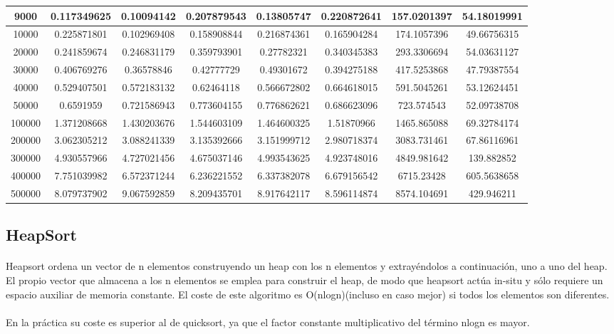 \documentclass{article}
\begin{document}
\begin{table}[]
\begin{tabular}{|c|c|c|c|c|c|c|c| }
9000	&0.117349625	&0.10094142	&0.207879543	&0.13805747	&0.220872641	&157.0201397	&54.18019991\\ \hline
10000	&0.225871801	&0.102969408	&0.158908844	&0.216874361	&0.165904284	&174.1057396	&49.66756315\\ \hline
20000	&0.241859674	&0.246831179	&0.359793901	&0.27782321	&0.340345383	&293.3306694	&54.03631127\\ \hline
30000	&0.406769276	&0.36578846	&0.42777729	&0.49301672	&0.394275188	&417.5253868	&47.79387554\\ \hline
40000	&0.529407501	&0.572183132	&0.62464118	&0.566672802	&0.664618015	&591.5045261	&53.12624451\\ \hline
50000	&0.6591959	&0.721586943	&0.773604155	&0.776862621	&0.686623096	&723.574543	&52.09738708\\ \hline
100000	&1.371208668	&1.430203676	&1.544603109	&1.464600325	&1.51870966	&1465.865088	&69.32784174\\ \hline
200000	&3.062305212	&3.088241339	&3.135392666	&3.151999712	&2.980718374	&3083.731461	&67.86116961\\ \hline
300000	&4.930557966	&4.727021456	&4.675037146	&4.993543625	&4.923748016	&4849.981642	&139.882852\\ \hline
400000	&7.751039982	&6.572371244	&6.236221552	&6.337382078	&6.679156542	&6715.23428	&605.5638658\\ \hline
500000	&8.079737902	&9.067592859	&8.209435701	&8.917642117	&8.596114874	&8574.104691	&429.946211\\ \hline

             \end{tabular}
    \end{table}

    \subsection{HeapSort}
        \paragraph {}
        Heapsort ordena un vector de n elementos construyendo un heap con los n elementos y extrayéndolos a continuación, uno a uno del heap. El propio vector que almacena a los n elementos se emplea para construir el heap, de modo que heapsort actúa in-situ y sólo requiere un espacio auxiliar de memoria constante. El coste de este algoritmo es O(nlogn)(incluso en caso mejor) si todos los elementos son diferentes.
        \paragraph {}
        En la práctica su coste es superior al de quicksort, ya que el factor constante multiplicativo del término nlogn es mayor.
\end{document}
